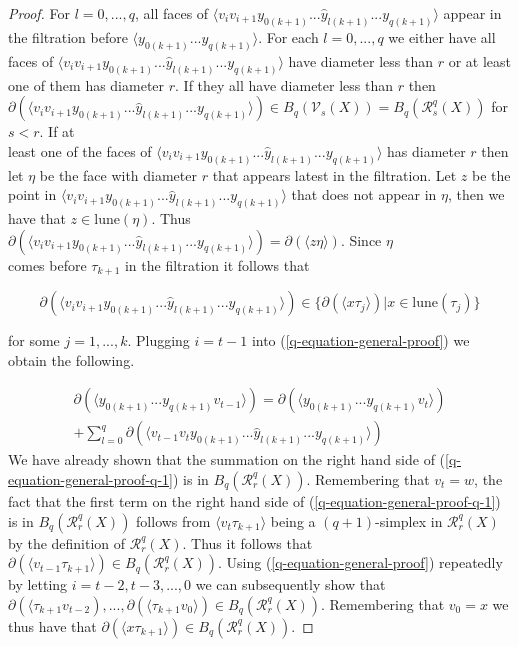 \documentclass[10pt,a4paper]{amsart}
\newcommand\Vr{\mathcal{V}}
\newcommand\lune{\mathrm{lune}}
\newcommand\rvr{\mathcal{R}}
\begin{document}
\begin{proof}
For $l= 0,...,q$, all faces of $\langle v_{i}v_{i+1}y_{0(k+1)}...\hat{y}_{l(k+1)}...y_{q(k+1)} \rangle$ appear in the filtration before $\langle y_{0(k+1)}...y_{q(k+1)} \rangle$. For each $l=0,...,q$ we either have all \\faces of $\langle v_{i}v_{i+1}y_{0(k+1)}...\hat{y}_{l(k+1)}...y_{q(k+1)} \rangle$ have diameter less than $r$ or at least one of them has diameter $r$. If they all have diameter less than $r$ then \\ $\partial (\langle v_{i}v_{i+1}y_{0(k+1)}...\hat{y}_{l(k+1)}...y_{q(k+1)} \rangle) \in B_{q}(\Vr_{s}(X)) = B_{q}(\rvr^{q}_{s}(X))$ for $s < r$. If at \\ least one of the faces of $\langle v_{i}v_{i+1}y_{0(k+1)}...\hat{y}_{l(k+1)}...y_{q(k+1)} \rangle$ has diameter $r$ then let $\eta$ be the face with diameter $r$ that appears latest in the filtration. Let $z$ be the \\ point in $\langle v_{i}v_{i+1}y_{0(k+1)}...\hat{y}_{l(k+1)}...y_{q(k+1)} \rangle$ that does not appear in $\eta$, then we have that $z\in \lune(\eta)$. Thus $\partial (\langle v_{i}v_{i+1}y_{0(k+1)}...\hat{y}_{l(k+1)}...y_{q(k+1)} \rangle) = \partial(\langle z \eta\rangle)$. Since $\eta$ \\ comes before $\tau_{k+1}$ in the filtration it follows that 

\begin{equation}
\partial (\langle v_{i}v_{i+1}y_{0(k+1)}...\hat{y}_{l(k+1)}...y_{q(k+1)} \rangle) \in \{\partial (\langle x \tau_{j} \rangle) | x \in \lune (\tau_{j})\}
\end{equation}

for some $j = 1,...,k$.
Plugging $i = t-1$ into  (\ref{q-equation-general-proof}) we obtain the following.

\begin{equation}
\begin{aligned}
\label{q-equation-general-proof-q-1}
    \partial (\langle y_{0(k+1)}...y_{q(k+1)} v_{t-1} \rangle ) = 
    \partial (\langle y_{0(k+1)}...y_{q(k+1)} v_{t} \rangle)\\ + \sum_{l=0}^{q}\partial (\langle v_{t-1}v_{t}y_{0(k+1)}...\hat{y}_{l(k+1)}...y_{q(k+1)} \rangle)
    \end{aligned}
\end{equation}
We have already shown that the summation on the right hand side of (\ref{q-equation-general-proof-q-1}) is in $B_{q}(\rvr_{r}^{q}(X))$. Remembering that $v_{t} = w$, the fact that the first term on the right hand side of (\ref{q-equation-general-proof-q-1}) is in $B_{q}(\rvr_{r}^{q}(X))$ follows from $\langle v_{t}\tau_{k+1}\rangle$ being a $(q+1)$-simplex in $\rvr_{r}^{q}(X)$ by the definition of $\rvr_{r}^{q}(X)$. Thus it follows that $\partial (\langle v_{t-1} \tau_{k+1} \rangle) \in B_{q}(\rvr_{r}^{q}(X))$. Using (\ref{q-equation-general-proof}) repeatedly by letting $i = t-2, t-3, ...,0$ we can subsequently show that $\partial (\langle \tau_{k+1}v_{t-2}),...,\partial(\langle \tau_{k+1}v_{0}\rangle) \in B_{q}(\rvr_{r}^{q}(X))$. Remembering that $v_{0} = x$ we thus have that $\partial (\langle x\tau_{k+1} \rangle)   \in B_{q}(\rvr_{r}^{q}(X))$. 


\end{proof}
\end{document}
